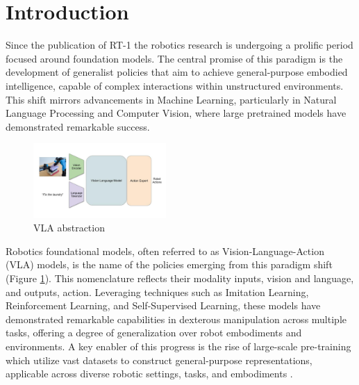 \section{Introduction}


Since the publication of RT-1 \cite{RT-1} the robotics research is undergoing a prolific period focused around foundation models. The central promise of this paradigm is the development of generalist policies that aim to achieve general-purpose embodied intelligence, capable of complex interactions within unstructured environments. This shift mirrors advancements in Machine Learning, particularly in Natural Language Processing and Computer Vision, where large pretrained models have demonstrated remarkable success.

\begin{figure}
    \centering
    \includegraphics[width=0.45\textwidth]{images/vla.jpg}
    \caption{VLA abstraction}
    \label{fig:vla_abstraction}
\end{figure}

Robotics foundational models, often referred to as Vision-Language-Action (VLA) models, is the name of the policies emerging from this paradigm shift (Figure \ref{fig:vla_abstraction}). This nomenclature reflects their modality inputs, vision and language, and outputs, action. Leveraging techniques such as Imitation Learning, Reinforcement Learning, and Self-Supervised Learning, these models have demonstrated remarkable capabilities in dexterous manipulation across multiple tasks, offering a degree of generalization over robot embodiments and environments. A key enabler of this progress is the rise of large-scale pre-training which utilize vast datasets to construct general-purpose representations, applicable across diverse robotic settings, tasks, and embodiments \cite{TransferWelle}.


